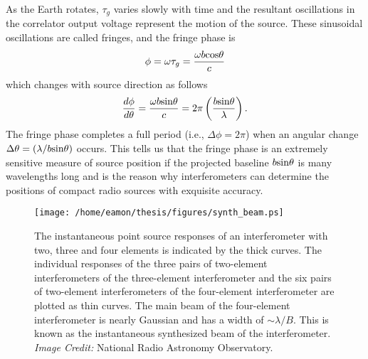 As the Earth rotates, $\tau _g$ varies slowly with time and the resultant oscillations in the correlator output voltage represent the motion of the source. These sinusoidal oscillations are called fringes, and the fringe phase is 
\begin{equation}
\phi = \omega \tau _g = \frac{\omega b\rm{cos} \theta}{c}
\end{equation}
which changes with source direction as follows
\begin{equation}
\frac{d\phi}{d\theta}= \frac{\omega b\rm{sin} \theta}{c}=2\pi\left(\frac{b\rm{sin}\theta}{\lambda}\right).
\end{equation}
The fringe phase completes a full period (i.e., $\Delta \phi=2\pi$) when an angular change $\Delta \theta=(\lambda/b\rm{sin}\theta)$ occurs. This tells us that the fringe phase is an extremely sensitive measure of source position if the projected baseline $b\rm{sin}\theta$ is many wavelengths long and is the reason why interferometers can determine the positions of compact radio sources with exquisite accuracy.

\begin{figure}[t!]
\centering 
          \texttt{[image: /home/eamon/thesis/figures/synth\_beam.ps]}
\caption[Instantaneous point source responses of an interferometer]{The instantaneous point source responses of an interferometer with two, three and four elements is indicated by the thick curves. The individual responses of the three pairs of two-element interferometers of the three-element interferometer and the six pairs of two-element interferometers of the four-element interferometer are plotted as thin curves. The main beam of the four-element interferometer is nearly Gaussian and has a width of $\sim \lambda /B$. This is known as the instantaneous synthesized beam of the interferometer. \textit{Image Credit:} National Radio Astronomy Observatory.}
\label{fig2.7}
\end{figure}

